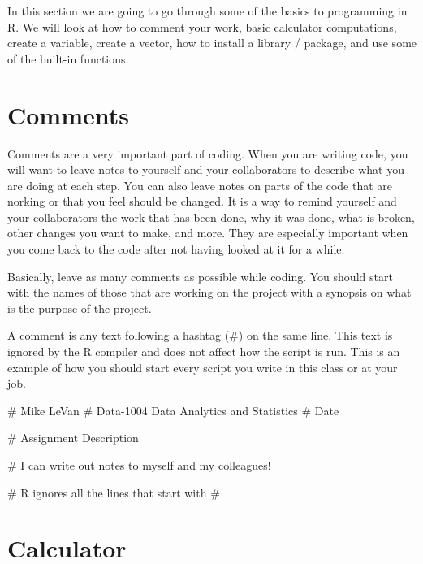 \documentclass[
  letterpaper,
  DIV=11,
  numbers=noendperiod]{scrreprt}
\newenvironment{Shaded}{\begin{snugshade}}{\end{snugshade}}
\newcommand{\CommentTok}[1]{\textcolor[rgb]{0.37,0.37,0.37}{#1}}
\begin{document}

In this section we are going to go through some of the basics to
programming in R. We will look at how to comment your work, basic
calculator computations, create a variable, create a vector, how to
install a library / package, and use some of the built-in functions.

\section*{Comments}\label{comments}


Comments are a very important part of coding. When you are writing code,
you will want to leave notes to yourself and your collaborators to
describe what you are doing at each step. You can also leave notes on
parts of the code that are norking or that you feel should be changed.
It is a way to remind yourself and your collaborators the work that has
been done, why it was done, what is broken, other changes you want to
make, and more. They are especially important when you come back to the
code after not having looked at it for a while.

Basically, leave as many comments as possible while coding. You should
start with the names of those that are working on the project with a
synopsis on what is the purpose of the project.

A comment is any text following a hashtag (\#) on the same line. This
text is ignored by the R compiler and does not affect how the script is
run. This is an example of how you should start every script you write
in this class or at your job.

\begin{Shaded}
\begin{Highlighting}[]
\CommentTok{\# Mike LeVan}
\CommentTok{\# Data{-}1004 Data Analytics and Statistics}
\CommentTok{\# Date}

\CommentTok{\# Assignment Description}

\CommentTok{\# I can write out notes to myself and my colleagues!}

\CommentTok{\# R ignores all the lines that start with \#}
\end{Highlighting}
\end{Shaded}

\section*{Calculator}\label{calculator}
\end{document}
